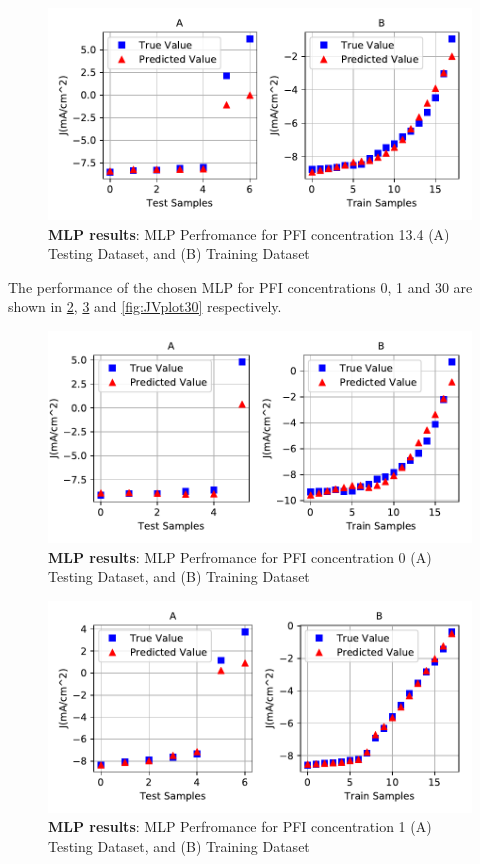 \documentclass[]{article}
\begin{document}
\begin{figure}
\centering
\includegraphics{Report_files/figure-latex/JVplot134-1.pdf}
\caption{\label{fig:JVplot134}\textbf{MLP results}: MLP Perfromance for PFI concentration 13.4 (A) Testing Dataset, and (B) Training Dataset}
\end{figure}

The performance of the chosen MLP for PFI concentrations 0, 1 and 30 are shown in \ref{fig:JVplot0}, \ref{fig:JVplot1} and \ref{fig:JVplot30} respectively.

\begin{figure}
\centering
\includegraphics{Report_files/figure-latex/JVplot0-1.pdf}
\caption{\label{fig:JVplot0}\textbf{MLP results}: MLP Perfromance for PFI concentration 0 (A) Testing Dataset, and (B) Training Dataset}
\end{figure}

\begin{figure}
\centering
\includegraphics{Report_files/figure-latex/JVplot1-1.pdf}
\caption{\label{fig:JVplot1}\textbf{MLP results}: MLP Perfromance for PFI concentration 1 (A) Testing Dataset, and (B) Training Dataset}
\end{figure}
\end{document}
